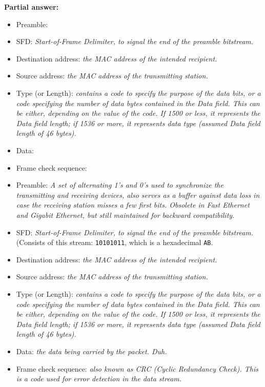 





\noindent
{\bf Partial answer:}

\vskip 10pt

\begin{itemize}
\item{} Preamble:
\vskip 5pt
\item{} SFD: {\it Start-of-Frame Delimiter, to signal the end of the preamble bitstream.}
\vskip 5pt
\item{} Destination address: {\it the MAC address of the intended recipient.}
\vskip 5pt
\item{} Source address: {\it the MAC address of the transmitting station.}
\vskip 5pt
\item{} Type (or Length): {\it contains a code to specify the purpose of the data bits, or a code specifying the number of data bytes contained in the Data field.  This can be either, depending on the value of the code.  If 1500 or less, it represents the Data field length; if 1536 or more, it represents data type (assumed Data field length of 46 bytes).}
\vskip 5pt
\item{} Data:
\vskip 5pt
\item{} Frame check sequence:
\end{itemize}







\begin{itemize}
\item{} Preamble: {\it A set of alternating 1's and 0's used to synchronize the transmitting and receiving devices, also serves as a buffer against data loss in case the receiving station misses a few first bits.  Obsolete in Fast Ethernet and Gigabit Ethernet, but still maintained for backward compatibility.}
\vskip 5pt
\item{} SFD: {\it Start-of-Frame Delimiter, to signal the end of the preamble bitstream.}  (Consists of this stream: {\tt 10101011}, which is a hexadecimal {\tt AB}.
\vskip 5pt
\item{} Destination address: {\it the MAC address of the intended recipient.}
\vskip 5pt
\item{} Source address: {\it the MAC address of the transmitting station.}
\vskip 5pt
\item{} Type (or Length): {\it contains a code to specify the purpose of the data bits, or a code specifying the number of data bytes contained in the Data field.  This can be either, depending on the value of the code.  If 1500 or less, it represents the Data field length; if 1536 or more, it represents data type (assumed Data field length of 46 bytes).}
\vskip 5pt
\item{} Data: {\it the data being carried by the packet.  Duh.}
\vskip 5pt
\item{} Frame check sequence: {\it also known as CRC (Cyclic Redundancy Check).  This is a code used for error detection in the data stream.}
\end{itemize}




